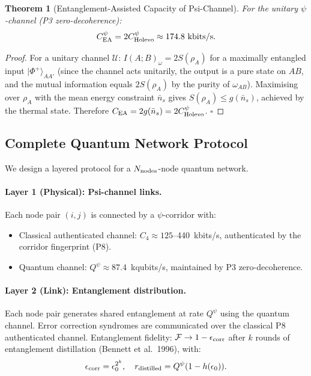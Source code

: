 \documentclass[aps,prd,twocolumn,superscriptaddress,nofootinbib]{revtex4-2}
\newtheorem{theorem}{Theorem}
\begin{document}
\begin{theorem}[Entanglement-Assisted Capacity of Psi-Channel]
\label{thm:EA}
For the unitary $\psi$-channel (P3 zero-decoherence):
\begin{equation}
C_{\rm EA}^\psi = 2 C_{\rm Holevo}^\psi \approx 174.8~\text{kbits/s}.
\label{eq:CEA}
\end{equation}
\end{theorem}

\begin{proof}
For a unitary channel $\mathcal{U}$:
$I(A;B)_{\omega} = 2 S(\rho_A)$ for a maximally entangled input
$|\Phi^+\rangle_{AA'}$ (since the channel acts unitarily, the output
is a pure state on $AB$, and the mutual information equals $2S(\rho_A)$
by the purity of $\omega_{AB}$). Maximising over $\rho_A$ with the
mean energy constraint $\bar{n}_s$ gives $S(\rho_A) \leq g(\bar{n}_s)$,
achieved by the thermal state. Therefore
$C_{\rm EA} = 2g(\bar{n}_s) = 2C_{\rm Holevo}^\psi$. $\square$
\end{proof}

\subsection{Complete Quantum Network Protocol}

We design a layered protocol for a $N_{\rm nodes}$-node quantum network.

\paragraph{Layer 1 (Physical): Psi-channel links.}
Each node pair $(i,j)$ is connected by a $\psi$-corridor with:
\begin{itemize}
\item Classical authenticated channel: $C_4 \approx 125$--440~kbits/s,
authenticated by the corridor fingerprint (P8).
\item Quantum channel: $Q^\psi \approx 87.4$~kqubits/s, maintained by P3
zero-decoherence.
\end{itemize}

\paragraph{Layer 2 (Link): Entanglement distribution.}
Each node pair generates shared entanglement at rate $Q^\psi$ using
the quantum channel. Error correction syndromes are communicated
over the classical P8 authenticated channel. Entanglement fidelity:
$\mathcal{F} \to 1 - \epsilon_{\rm corr}$ after $k$ rounds of
entanglement distillation (Bennett et al.\ 1996), with:
\begin{equation}
\epsilon_{\rm corr} = \epsilon_0^{2^k}, \quad r_{\rm distilled} = Q^\psi(1 - h(\epsilon_0)).
\end{equation}
\end{document}
